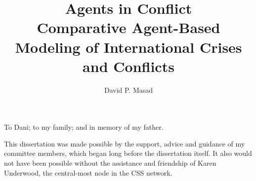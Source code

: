 \documentclass[11 pt]{report}
\begin{document}
\title{Agents in Conflict\\
            Comparative Agent-Based Modeling of International Crises and Conflicts}
\author{David P. Masad}













\signaturepage

\titlepage

\copyrightpage


\dedicationpage

\noindent To Dani; to my family; and in memory of my father.


\acknowledgementspage

\noindent This dissertation was made possible by the support, advice and guidance of my committee members, which began long before the dissertation itself. It also would not have been possible without the assistance and friendship of Karen Underwood, the central-most node in the CSS network.
\end{document}

